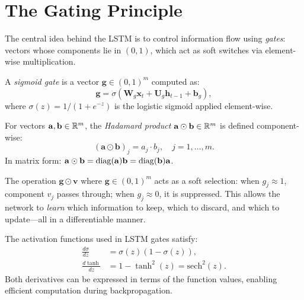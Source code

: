 \documentclass[11pt,a4paper]{article}
\begin{document}
\section{The Gating Principle}
\label{sec:gating-principle}

The central idea behind the LSTM is to control information flow using
\emph{gates}: vectors whose components lie in $(0, 1)$, which act as
soft switches via element-wise multiplication.

\begin{definition}
\label{def:sigmoid-gate}
A \emph{sigmoid gate} is a vector
$\mathbf{g} \in (0, 1)^m$ computed as:
\[
  \mathbf{g} = \sigma(\mathbf{W}_g \mathbf{x}_t +
    \mathbf{U}_g \mathbf{h}_{t-1} + \mathbf{b}_g),
\]
where $\sigma(z) = 1/(1 + e^{-z})$ is the logistic sigmoid applied
element-wise.
\end{definition}

\begin{definition}
\label{def:hadamard}
For vectors $\mathbf{a}, \mathbf{b} \in \mathbb{R}^m$, the \emph{Hadamard
product} $\mathbf{a} \odot \mathbf{b} \in \mathbb{R}^m$ is defined
component-wise:
\[
  (\mathbf{a} \odot \mathbf{b})_j = a_j \cdot b_j,
  \quad j = 1, \ldots, m.
\]
In matrix form: $\mathbf{a} \odot \mathbf{b} =
\operatorname{diag}(\mathbf{a})\mathbf{b} = \operatorname{diag}(\mathbf{b})\mathbf{a}$.
\end{definition}

\begin{remark}
\label{rem:gating}
The operation $\mathbf{g} \odot \mathbf{v}$ where
$\mathbf{g} \in (0, 1)^m$ acts as a soft selection: when
$g_j \approx 1$, component $v_j$ passes through; when
$g_j \approx 0$, it is suppressed.  This allows the network to
\emph{learn} which information to keep, which to discard, and which
to update---all in a differentiable manner.
\end{remark}

\begin{proposition}
\label{prop:activation-derivatives}
The activation functions used in LSTM gates satisfy:
\begin{align}
  \frac{d\sigma}{dz} &= \sigma(z)(1 - \sigma(z)),
    \label{eq:sigmoid-deriv} \\
  \frac{d\tanh}{dz} &= 1 - \tanh^2(z) = \mathrm{sech}^2(z).
    \label{eq:tanh-deriv}
\end{align}
Both derivatives can be expressed in terms of the function values,
enabling efficient computation during backpropagation.
\end{proposition}
\end{document}
